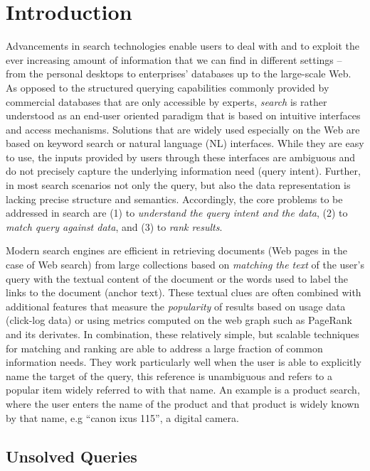 \section{Introduction}
Advancements in search technologies enable users to deal with and to exploit the ever increasing amount of information that we can find in different settings -- from the personal desktops to enterprises' databases up to the large-scale Web. As opposed to the structured querying capabilities commonly provided by commercial databases that are only accessible by experts, \emph{search} is rather understood as an end-user oriented paradigm that is based on intuitive interfaces and access mechanisms. Solutions that are widely used especially on the Web are based on keyword search 
or 
natural language (NL) interfaces. While they are easy to use, the inputs provided by users through these interfaces are ambiguous and do not precisely capture the underlying information need (query intent). 
Further, in most search scenarios not only the query, but also the data representation is lacking precise structure and semantics. Accordingly, the core problems to be addressed in search are (1) to \emph{understand the query intent and the data}, (2) to \emph{match query against data}, and (3) to \emph{rank results}. 

Modern search engines are efficient in retrieving documents (Web pages in the case of Web search) from large collections based on \emph{matching the text} of the user's query with the textual content of the document or the words used to label the links to the document (anchor text). These textual clues are often combined with additional features that measure the \emph{popularity} of results based on usage data (click-log data) or using metrics computed on the web graph such as PageRank and its derivates. In combination, these relatively simple, but scalable techniques for matching and ranking are able to address a large fraction of common information needs. They work particularly well when the user is able to explicitly name the target of the query, this reference is unambiguous and refers to a popular item widely referred to with that name. An example is a product search, where the user enters the name of the product and that product is widely known by that name, e.g ``canon ixus 115'', a digital camera.


\subsection{Unsolved Queries}

